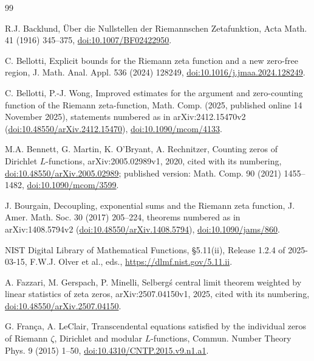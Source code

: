 \documentclass[11pt,a4paper]{article}
\numberwithin{equation}{section}
\theoremstyle{definition}
\theoremstyle{remark}
\begin{document}
\begin{thebibliography}{99}

 R.J. Backlund, \"Uber die Nullstellen der Riemannschen Zetafunktion, Acta Math. 41 (1916) 345--375, \href{https://doi.org/10.1007/BF02422950}{doi:10.1007/BF02422950}.

 C. Bellotti, Explicit bounds for the Riemann zeta function and a new zero-free region, J. Math. Anal. Appl. 536 (2024) 128249, \href{https://doi.org/10.1016/j.jmaa.2024.128249}{doi:10.1016/j.jmaa.2024.128249}.

 C. Bellotti, P.-J. Wong, Improved estimates for the argument and zero-counting function of the Riemann zeta-function, Math. Comp. (2025, published online 14 November 2025), statements numbered as in arXiv:2412.15470v2 (\href{https://doi.org/10.48550/arXiv.2412.15470}{doi:10.48550/arXiv.2412.15470}), \href{https://doi.org/10.1090/mcom/4133}{doi:10.1090/mcom/4133}.

 M.A. Bennett, G. Martin, K. O'Bryant, A. Rechnitzer, Counting zeros of Dirichlet $L$-functions, arXiv:2005.02989v1, 2020, cited with its numbering, \href{https://doi.org/10.48550/arXiv.2005.02989}{doi:10.48550/arXiv.2005.02989}; published version: Math. Comp. 90 (2021) 1455--1482, \href{https://doi.org/10.1090/mcom/3599}{doi:10.1090/mcom/3599}.

 J. Bourgain, Decoupling, exponential sums and the Riemann zeta function, J. Amer. Math. Soc. 30 (2017) 205--224, theorems numbered as in arXiv:1408.5794v2 (\href{https://doi.org/10.48550/arXiv.1408.5794}{doi:10.48550/arXiv.1408.5794}), \href{https://doi.org/10.1090/jams/860}{doi:10.1090/jams/860}.

 NIST Digital Library of Mathematical Functions, \S5.11(ii), Release 1.2.4 of 2025-03-15, F.W.J. Olver et al., eds., \url{https://dlmf.nist.gov/5.11.ii}.

 A. Fazzari, M. Gerspach, P. Minelli, Selberg\'s central limit theorem weighted by linear statistics of zeta zeros, arXiv:2507.04150v1, 2025, cited with its numbering, \href{https://doi.org/10.48550/arXiv.2507.04150}{doi:10.48550/arXiv.2507.04150}.

 G. Fran\c{c}a, A. LeClair, Transcendental equations satisfied by the individual zeros of Riemann $\zeta$, Dirichlet and modular $L$-functions, Commun. Number Theory Phys. 9 (2015) 1--50, \href{https://doi.org/10.4310/CNTP.2015.v9.n1.a1}{doi:10.4310/CNTP.2015.v9.n1.a1}.


\end{thebibliography}
\end{document}
